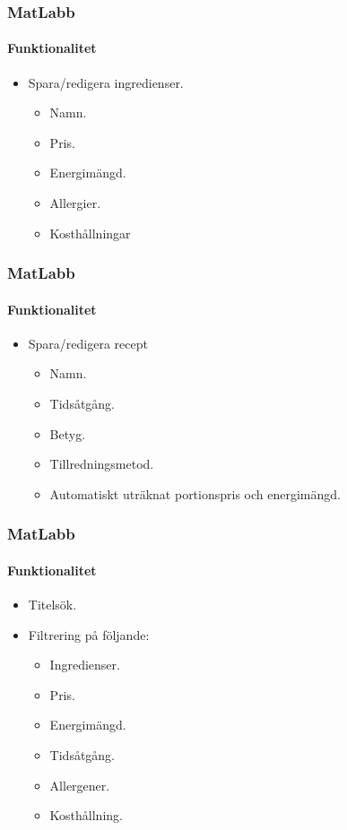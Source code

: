 \begin{frame}
  \frametitle{MatLabb}
  \framesubtitle{Funktionalitet}
  \begin{itemize}
  \item<1-> Spara/redigera ingredienser.
    \begin{itemize}
    \item<1-> Namn.
    \item<1-> Pris.
    \item<1-> Energimängd.
    \item<1-> Allergier.
    \item<1-> Kosthållningar
    \end{itemize}  
  \end{itemize}
\end{frame}

\begin{frame}
  \frametitle{MatLabb}
  \framesubtitle{Funktionalitet}
  \begin{itemize}
  \item<1-> Spara/redigera recept
    \begin{itemize}
    \item<1-> Namn.
    \item<1-> Tidsåtgång.
    \item<1-> Betyg.
    \item<1-> Tillredningsmetod.
    \item<1-> Automatiskt uträknat portionspris och energimängd.
    \end{itemize}
  \end{itemize}
\end{frame}

\begin{frame}
  \frametitle{MatLabb}
  \framesubtitle{Funktionalitet}
  \begin{itemize}
  \item<1-> Titelsök.
  \item<2-> Filtrering på följande:
    \begin{itemize}
    \item<2-> Ingredienser.
    \item<2-> Pris.
    \item<2-> Energimängd.
    \item<2-> Tidsåtgång.
    \item<2-> Allergener.
    \item<2-> Kosthållning.
    \end{itemize}
  \end{itemize}
\end{frame}

